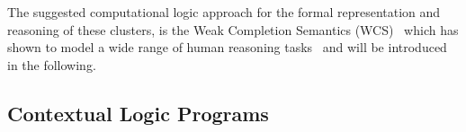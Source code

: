 \documentclass[12pt]{article}
\begin{document}
The suggested computational logic approach for the formal representation and reasoning of these clusters,
is the Weak Completion Semantics (WCS)~\cite{hk:2009a,hk:2009b}
which has shown to model a wide range of human reasoning tasks~\cite{btg:2015:h}
and will be introduced in the following.

\subsection{Contextual Logic Programs} \label{sect:wcs}
\end{document}
